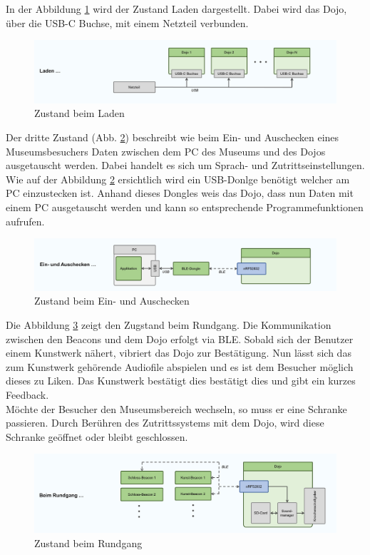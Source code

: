 \documentclass[10pt,a4paper,oneside]{99_fhnwreport}
\begin{document}
In der Abbildung \ref{fig:image2} wird der Zustand Laden dargestellt. Dabei wird das Dojo, über die USB-C Buchse, mit einem Netzteil verbunden.

\begin{figure}[htb]
\includegraphics[width=\textwidth]{Zustand_Laden.png}
\caption{Zustand beim Laden} %
\label{fig:image2}
\end{figure}

Der dritte Zustand (Abb. \ref{fig:image1}) beschreibt wie beim Ein- und Auschecken eines Museumsbesuchers Daten zwischen dem PC des Museums und des Dojos ausgetauscht werden. Dabei handelt es sich um Sprach- und Zutrittseinstellungen. Wie auf der Abbildung \ref{fig:image1} ersichtlich wird ein USB-Donlge benötigt welcher am PC einzustecken ist. Anhand dieses Dongles weis das Dojo, dass nun Daten mit einem PC ausgetauscht werden und kann so entsprechende Programmefunktionen aufrufen.

\begin{figure}[htb]
\includegraphics[width=\textwidth]{Zustand_Ein_Aus_Checken.png}
\caption{Zustand beim Ein- und Auschecken} %
\label{fig:image1}
\end{figure}

Die Abbildung \ref{fig:image4} zeigt den Zugstand beim Rundgang. Die Kommunikation zwischen den Beacons und dem Dojo erfolgt via BLE. Sobald sich der Benutzer einem Kunstwerk nähert, vibriert das Dojo zur Bestätigung. Nun lässt sich das zum Kunstwerk gehörende Audiofile abspielen und es ist dem Besucher möglich dieses zu Liken. Das Kunstwerk bestätigt dies bestätigt dies und gibt ein kurzes Feedback. \\
Möchte der Besucher den Museumsbereich wechseln, so muss er eine Schranke passieren. Durch Berühren des Zutrittssystems mit dem Dojo, wird diese Schranke geöffnet oder bleibt geschlossen.

\begin{figure}[htb]
\includegraphics[width=\textwidth]{Zustand_Rundgang.png}
\caption{Zustand beim Rundgang} %
\label{fig:image4}
\end{figure}
\end{document}
